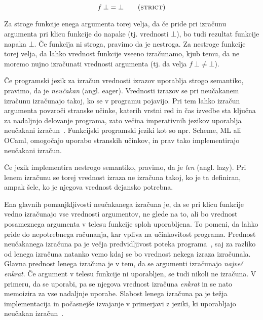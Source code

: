 \begin{equation}
   f \: \bot = \bot
   \tag{\textsc{strict}}
   \label{eq:strict}
\end{equation}

Za stroge funkcije enega argumenta torej velja, da če pride pri izračunu argumenta pri klicu funkcije do napake (tj. vrednosti $\bot$), bo tudi rezultat funkcije napaka $\bot$. Če funkcija ni stroga, pravimo da je nestroga. Za nestroge funkcije torej velja, da lahko vrednost funkcije vseeno izračunamo, kjub temu, da ne moremo nujno izračunati vrednosti argumenta (tj. da velja $f \: \bot \neq \bot$).

Če programski jezik za izračun vrednosti izrazov uporablja strogo semantiko, pravimo, da je \emph{neučakan} (angl. eager). Vrednosti izrazov se pri neučakanem izračunu izračunajo takoj, ko se v programu pojavijo. Pri tem lahko izračun argumenta povzroči stranske učinke, katerih vrstni red in čas izvedbe sta ključna za nadaljnjo delovanje programa, zato večina imperativnih jezikov uporablja neučakani izračun~\cite{peyton1987implementation}. Funkcijski programski jeziki kot so npr. Scheme, ML ali OCaml, omogočajo uporabo stranskih učinkov, in prav tako implementirajo neučakani izračun.

Če jezik implementira nestrogo semantiko, pravimo, da je \emph{len} (angl. lazy). Pri lenem izračunu se torej vrednost izraza ne izračuna takoj, ko je ta definiran, ampak šele, ko je njegova vrednost dejansko potrebna.

Ena glavnih pomanjkljivosti neučakanega izračuna je, da se pri klicu funkcije vedno izračunajo vse vrednosti argumentov, ne glede na to, ali bo vrednost posameznega argumenta v telesu funkcije sploh uporabljena. To pomeni, da lahko pride do nepotrebnega računanja, kar vpliva na učinkovitost programa. Prednost neučakanega izračuna pa je večja predvidljivost poteka programa~\cite{peyton1987implementation}, saj za razliko od lenega izračuna natanko vemo kdaj se bo vrednost nekega izraza izračunala. Glavna prednost lenega izračuna je v tem, da se argumenti izračunajo \emph{največ enkrat}. Če argument v telesu funkcije ni uporabljen, se tudi nikoli ne izračuna. V primeru, da se uporabi, pa se njegova vrednost izračuna \textit{enkrat} in se nato memoizira za vse nadaljnje uporabe. Slabost lenega izračuna pa je težja implementacija in počasnejše izvajanje v primerjavi z jeziki, ki uporabljajo neučakan izračun~\cite{peyton1987implementation, sebesta2004concepts}.

